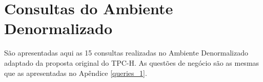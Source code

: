 
\chapter{Consultas do Ambiente Denormalizado}
\label{queries_2}


São apresentadas aqui as 15 consultas realizadas no Ambiente Denormalizado adaptado da proposta original do TPC-H. As questões de negócio são as mesmas que as apresentadas no Apêndice \ref{queries_1}.

\begin{enumerate}


	

	


\end{enumerate}
